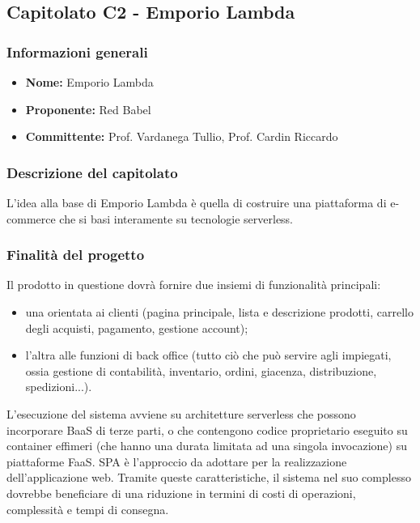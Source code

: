 \subsection{Capitolato C2 - Emporio Lambda}


\subsubsection{Informazioni generali}

\begin{itemize}
	\item{\textbf{Nome:}} Emporio Lambda
	\item{\textbf{Proponente:}} Red Babel
	\item{\textbf{Committente:}} Prof. Vardanega Tullio, Prof. Cardin Riccardo
\end{itemize}



\subsubsection{Descrizione del capitolato}

L'idea alla base di Emporio Lambda è quella di costruire una piattaforma di e-commerce che si basi interamente su tecnologie serverless.


\subsubsection{Finalità del progetto}

Il prodotto in questione dovrà fornire due insiemi di funzionalità principali: 
\begin{itemize}
	\item una orientata ai clienti (pagina principale, lista e descrizione prodotti, carrello degli acquisti, pagamento, gestione account);
	\item l'altra alle funzioni di back office (tutto ciò che può servire agli impiegati, ossia gestione di contabilità, inventario, ordini, giacenza, distribuzione, spedizioni...).
\end{itemize}

L'esecuzione del sistema avviene su architetture serverless che possono incorporare BaaS di terze parti, o che contengono codice proprietario eseguito su container effimeri (che hanno una durata limitata ad una singola invocazione) su piattaforme FaaS. SPA è l'approccio da adottare per la realizzazione dell'applicazione web. Tramite queste caratteristiche, il sistema nel suo complesso dovrebbe beneficiare di una riduzione in termini di costi di operazioni, complessità e tempi di consegna.


